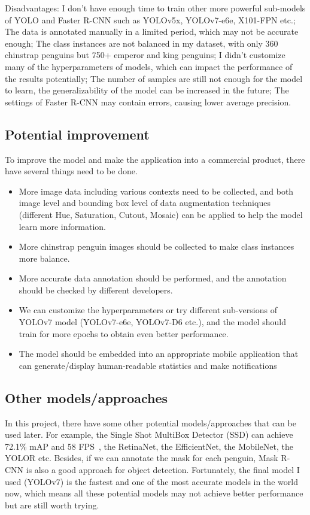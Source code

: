 \documentclass[runningheads]{llncs}
\begin{document}
Disadvantages: I don't have enough time to train other more powerful sub-models of YOLO and Faster R-CNN such as YOLOv5x, YOLOv7-e6e, X101-FPN etc.; The data is annotated manually in a limited period, which may not be accurate enough; The class instances are not balanced in my dataset, with only 360 chinstrap penguins but 750+ emperor and king penguins; I didn't customize many of the hyperparameters of models, which can impact the performance of the results potentially; The number of samples are still not enough for the model to learn, the generalizability of the model can be increased in the future; The settings of Faster R-CNN may contain errors, causing lower average precision.

\subsection{Potential improvement}
To improve the model and make the application into a commercial product, there have several things need to be done. 
\begin{itemize}
    \item More image data including various contexts need to be collected, and both image level and bounding box level of data augmentation techniques (different Hue, Saturation, Cutout, Mosaic) can be applied to help the model learn more information.
    \item More chinstrap penguin images should be collected to make class instances more balance.
    \item More accurate data annotation should be performed, and the annotation should be checked by different developers.
    \item We can customize the hyperparameters or try different sub-versions of YOLOv7 model (YOLOv7-e6e, YOLOv7-D6 etc.), and the model should train for more epochs to obtain even better performance.
    \item The model should be embedded into an appropriate mobile application that can generate/display human-readable statistics and make notifications
\end{itemize}


\subsection{Other models/approaches}
In this project, there have some other potential models/approaches that can be used later. For example, the Single Shot MultiBox Detector (SSD) can achieve 72.1\% mAP and 58 FPS~\cite{ssd}, the RetinaNet, the EfficientNet, the MobileNet, the YOLOR etc. Besides, if we can annotate the mask for each penguin, Mask R-CNN is also a good approach for object detection. Fortunately, the final model I used (YOLOv7) is the fastest and one of the most accurate models in the world now, which means all these potential models may not achieve better performance but are still worth trying. 
\end{document}
